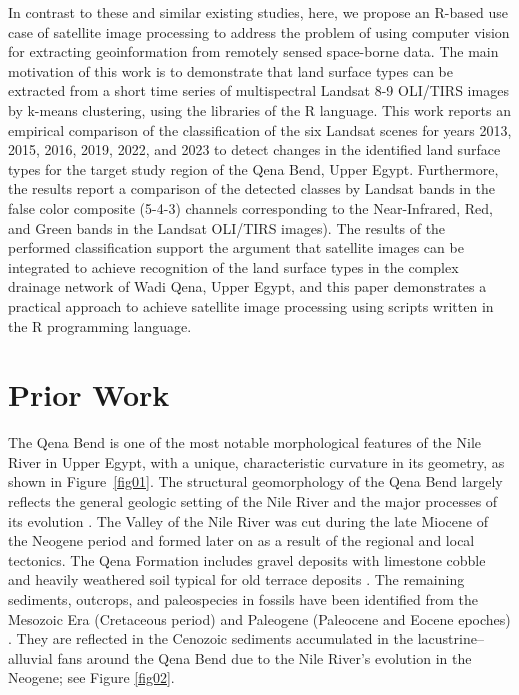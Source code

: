 \documentclass[information,article,accept,pdftex,moreauthors]{Definitions/mdpi}
\begin{document}
{In contrast to these and similar existing studies, here, }we propose an R-based {use case of }satellite image processing to address the problem of {using computer vision } for extracting geoinformation from remotely sensed {space-borne }data. The main motivation of this work is to demonstrate that land surface types can be extracted from a short time series of multispectral Landsat 8-9 OLI/TIRS images by k-means clustering{, using the libraries of the }R language. This work reports an empirical comparison of the classification of the six Landsat scenes for years 2013, 2015, 2016, 2019, 2022, and 2023 to detect changes in the identified land surface types for the target study region of the Qena Bend, Upper Egypt. Furthermore, the results report a comparison of the detected classes by Landsat bands in the false color composite (5-4-3) channels corresponding to the Near-Infrared, Red, and Green bands in the Landsat OLI/TIRS images). The results of the performed classification support the argument that satellite images can be integrated to achieve recognition of the land surface types in the complex drainage network of Wadi Qena, Upper Egypt, and this paper demonstrates {a }practical approach to achieve satellite image processing {using scripts written in the }R programming language.

\section{Prior Work}

{The }Qena Bend is one of the most notable morphological features of the Nile River in Upper Egypt{, with }a unique, characteristic curvature in its geometry, {as shown in }\mbox{Figure \ref{fig01}}. The structural geomorphology of the Qena Bend largely reflects the general geologic setting of the Nile River and the major processes of its evolution \cite{Said1981,said2017geology}. The Valley of the Nile River was cut during the late Miocene of the Neogene period and formed later on as a result of the regional and local tectonics. The Qena Formation includes gravel deposits with limestone cobble and heavily weathered soil typical for old terrace deposits \cite{paulissen1987egyptian}. The remaining sediments, outcrops, and paleospecies in fossils have been identified from the Mesozoic Era (Cretaceous period) \cite{ABDELHAMID2014138,SOLIMAN1986111} and Paleogene (Paleocene and Eocene epoches) \cite{MANDUR2022104594,sehim1993cretaceous}. They are reflected in the Cenozoic sediments accumulated in the lacustrine--alluvial fans around the Qena Bend due to the Nile River's evolution in the Neogene; see Figure \ref{fig02}.
\end{document}
